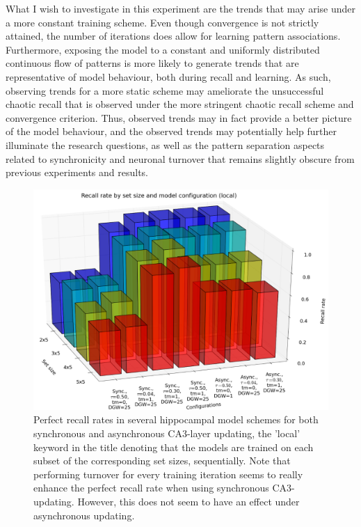 What I wish to investigate in this experiment are the trends that may arise under a more constant training scheme. Even though convergence is not strictly attained, the number of iterations does allow for learning pattern associations. Furthermore, exposing the model to a constant and uniformly distributed continuous flow of patterns is more likely to generate trends that are representative of model behaviour, both during recall and learning. As such, observing trends for a more static scheme may ameliorate the unsuccessful chaotic recall that is observed under the more stringent chaotic recall scheme and convergence criterion. Thus, observed trends may in fact provide a better picture of the model behaviour, and the observed trends may potentially help further illuminate the research questions, as well as the pattern separation aspects related to synchronicity and neuronal turnover that remains slightly obscure from previous experiments and results.


\begin{figure}
    \centering
    \includegraphics[width=14cm]{fig/i-iters/local-recall}
    \caption{Perfect recall rates in several hippocampal model schemes for both synchronous and asynchronous CA3-layer updating, the 'local' keyword in the title denoting that the models are trained on each subset of the corresponding set sizes, sequentially. Note that performing turnover for every training iteration seems to really enhance the perfect recall rate when using synchronous CA3-updating. However, this does not seem to have an effect under asynchronous updating.}
    \label{fig:local-recall}
\end{figure}

